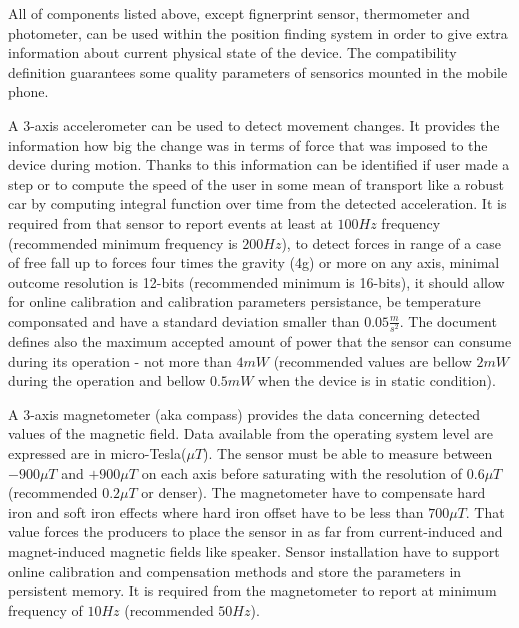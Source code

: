 \documentclass[../main.tex]{subfiles}
\begin{document}
All of components listed above, except fignerprint sensor, thermometer and photometer, can be used within the position finding system in order to give extra information about current physical state of the device. The compatibility definition guarantees some quality parameters of sensorics mounted in the mobile phone.

A 3-axis accelerometer can be used to detect movement changes. It provides the information how big the change was in terms of force that was imposed to the device during motion. Thanks to this information can be identified if user made a step or to compute the speed of the user in some mean of transport like a robust car by computing integral function over time from the detected acceleration. It is required from that sensor to report events at least at $100 Hz$ frequency (recommended minimum frequency is $200 Hz$), to detect forces in range of a case of free fall up to forces four times the gravity (4g) or more on any axis, minimal outcome resolution is 12-bits (recommended minimum is 16-bits), it should allow for online calibration and calibration parameters persistance, be temperature componsated and have a standard deviation smaller than $ 0.05 \frac{m}{s^2} $. The document defines also the maximum accepted amount of power that the sensor can consume during its operation - not more than $4 mW$ (recommended values are bellow $2 mW$ during the operation and bellow $0.5 mW$ when the device is in static condition).

A 3-axis magnetometer (aka compass) provides the data concerning detected values of the magnetic field. Data available from the operating system level are expressed are in micro-Tesla($\mu T$). The sensor must be able to measure between $-900 \mu T$ and $+900 \mu T$ on each axis before saturating with the resolution of $0.6 \mu T$ (recommended $0.2 \mu T$ or denser). The magnetometer have to compensate hard iron and soft iron effects where hard iron offset have to be less than $700 \mu T$. That value forces the producers to place the sensor in as far from current-induced and magnet-induced magnetic fields like speaker. Sensor installation have to support online calibration and compensation methods and store the parameters in persistent memory. It is required from the magnetometer to report at minimum frequency of $10 Hz$ (recommended $50 Hz$).
\end{document}
